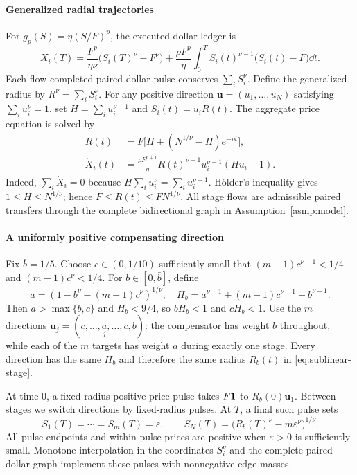 \documentclass[review,hidelinks,onefignum,onetabnum]{siamonline250211}
\begin{document}
\paragraph{Generalized radial trajectories}
For $g_p(S)=\eta(S/F)^p$, the executed-dollar ledger is
\begin{equation}\label{eq:sublinear-ledger}
X_i(T)=\frac{F^p}{\eta\nu}
\bigl(S_i(T)^\nu-F^\nu\bigr)
+\frac{\rho F^p}{\eta}\int_0^T
S_i(t)^{\nu-1}\bigl(S_i(t)-F\bigr)\dd t.
\end{equation}
Each flow-completed paired-dollar pulse conserves
$\sum_iS_i^\nu$. Define the generalized radius by
$R^\nu=\sum_iS_i^\nu$. For any positive direction
$\bm u=(u_1,\ldots,u_N)$ satisfying $\sum_i u_i^\nu=1$,
set $H=\sum_i u_i^{\nu-1}$ and $S_i(t)=u_iR(t)$.
The aggregate price equation is solved by
\begin{equation}\label{eq:sublinear-stage}
\begin{aligned}
R(t)&=F\bigl[H+(N^{1/\nu}-H)e^{-\rho t}\bigr],\\
\dot X_i(t)&=
\frac{\rho F^{p+1}}{\eta}
R(t)^{\nu-1}u_i^{\nu-1}(Hu_i-1).
\end{aligned}
\end{equation}
Indeed, $\sum_i\dot X_i=0$ because
$H\sum_i u_i^\nu=\sum_i u_i^{\nu-1}$.
H\"older's inequality gives $1\le H\le N^{1/\nu}$;
hence $F\le R(t)\le FN^{1/\nu}$. All stage flows
are admissible paired transfers through the complete
bidirectional graph in Assumption~\ref{asmp:model}.

\paragraph{A uniformly positive compensating direction}
Fix $\bar b=1/5$. Choose $c\in(0,1/10)$ sufficiently
small that $(m-1)c^{\nu-1}<1/4$ and
$(m-1)c^\nu<1/4$. For $b\in[0,\bar b]$, define
\[
a=(1-b^\nu-(m-1)c^\nu)^{1/\nu},\quad
H_b=a^{\nu-1}+(m-1)c^{\nu-1}+b^{\nu-1}.
\]
Then $a>\max\{b,c\}$ and $H_b<9/4$,
so $bH_b<1$ and $cH_b<1$. Use the $m$
directions
$\bm u_j=(c,\ldots,\underset{j}{a},\ldots,c,b)$:
the compensator has weight $b$ throughout, while
each of the $m$ targets has weight $a$ during
exactly one stage. Every direction has the same $H_b$
and therefore the same radius $R_b(t)$ in
\eqref{eq:sublinear-stage}.

At time $0$, a fixed-radius positive-price pulse
takes $F\mathbf{1}$ to $R_b(0)\bm u_1$. Between stages
we switch directions by fixed-radius pulses.
At $T$, a final such pulse sets
\[
S_1(T)=\cdots=S_m(T)=\varepsilon,\qquad
S_N(T)=\bigl(R_b(T)^\nu-m\varepsilon^\nu\bigr)^{1/\nu}.
\]
All pulse endpoints and within-pulse prices are
positive when $\varepsilon>0$ is sufficiently small.
Monotone interpolation in the coordinates $S_i^\nu$
and the complete paired-dollar graph implement
these pulses with nonnegative edge masses.
\end{document}
